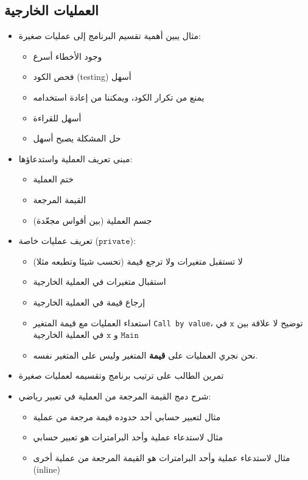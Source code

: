 \documentclass[12pt]{article}
\begin{document}
\subsection{العمليات الخارجية}


\begin{itemize}
    \item مثال يبين أهمية تقسيم البرنامج إلى عمليات صغيرة:
    \begin{itemize}
        \item وجود الأخطاء أسرع
        \item فحص الكود (testing) أسهل
        \item يمنع من تكرار الكود، ويمكننا من إعادة استخدامه
        \item أسهل للقراءة
        \item حل المشكلة يصبح أسهل
    \end{itemize}
    \item مبنى تعريف العملية واستدعاؤها:
    \begin{itemize}
        \item ختم العملية
        \item القيمة المرجعة
        \item جسم العملية (بين أقواس  مجعّدة)
    \end{itemize}
    \item تعريف عمليات خاصة ($\mathtt{private}$):
    \begin{itemize}
        \item لا تستقبل متغيرات ولا ترجع قيمة (تحسب شيئا وتطبعه مثلا)
        \item استقبال متغيرات في العملية الخارجية
        \item إرجاع قيمة في العملية الخارجية
        \item استعداء العمليات مع قيمة المتغير \textenglish{\texttt{Call by value}}، توضيح لا علاقة بين $\mathtt{x}$ في $\mathtt{Main}$ و $\mathtt{x}$ في العملية الخارجية
        \item نحن نجري العمليات على \textbf{قيمة} المتغير وليس على المتغير نفسه.
    \end{itemize}
    \item تمرين الطالب على ترتيب برنامج وتقسيمه لعمليات صغيرة
    \item شرح دمج القيمة المرجعة من العملية في تعبير رياضي:
    \begin{itemize}
        \item مثال لتعبير حسابي أحد حدوده قيمة مرجعة من عملية
        \item مثال لاستدعاء عملية وأحد البرامترات هو تعبير حسابي
        \item مثال لاستدعاء عملية وأحد البرامترات هو القيمة المرجعة من عملية أخرى (inline)
    \end{itemize}
\end{itemize}
\end{document}
